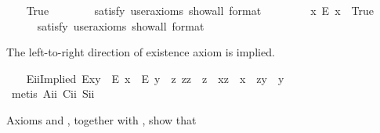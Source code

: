 \begin{isabellebody}
\begin{isamarkuptext}
\end{isamarkuptext}\isamarkuptrue%
\ \ \isamarkupfalse%
\ True\ \ %
\isanewline
\ \ \ \ \isamarkupfalse%
\ {\isacharbrackleft}satisfy{\isacharcomma}\ user{\isacharunderscore}axioms{\isacharcomma}\ show{\isacharunderscore}all{\isacharcomma}\ format\ {\isacharequal}\ {}{\isacharbrackright}%
\isadelimproof
\ %
\endisadelimproof
%
\isatagproof
{}\isamarkupfalse%
%
\endisatagproof
{\isafoldproof}%
%
\isadelimproof
%
\endisadelimproof
\isanewline
\ \ \isamarkupfalse%
\ \ {\isachardoublequoteopen}{\isasymexists}x{\isachardot}\ \isactrlbold {\isasymnot}{\isacharparenleft}E\ x{\isacharparenright}{\isachardoublequoteclose}\ \ True\ \ %
\ \ \isanewline
\ \ \ \ \isamarkupfalse%
\ {\isacharbrackleft}satisfy{\isacharcomma}\ user{\isacharunderscore}axioms{\isacharcomma}\ show{\isacharunderscore}all{\isacharcomma}\ format\ {\isacharequal}\ {}{\isacharbrackright}%
\isadelimproof
\ %
\endisadelimproof
%
\isatagproof
{}\isamarkupfalse%
%
\endisatagproof
{\isafoldproof}%
%
\isadelimproof
%
\endisadelimproof
%
\begin{isamarkuptext}%
The left-to-right direction of existence axiom  is implied.%
\end{isamarkuptext}\isamarkuptrue%
\ \ \isamarkupfalse%
\ E\isactrlsub i\isactrlsub iImplied{\isacharcolon}\ {\isachardoublequoteopen}E{\isacharparenleft}x{\isasymcdot}y{\isacharparenright}\ \isactrlbold {\isasymrightarrow}\ {\isacharparenleft}E\ x\ \isactrlbold {\isasymand}\ E\ y\ \isactrlbold {\isasymand}\ {\isacharparenleft}\isactrlbold {\isasymexists}z{\isachardot}\ z{\isasymcdot}z\ {\isasymcong}\ z\ \isactrlbold {\isasymand}\ x{\isasymcdot}z\ {\isasymcong}\ x\ \isactrlbold {\isasymand}\ z{\isasymcdot}y\ {\isasymcong}\ y{\isacharparenright}{\isacharparenright}{\isachardoublequoteclose}\ \isanewline
%
\isadelimproof
\ \ \ \ %
\endisadelimproof
%
\isatagproof
{}\isamarkupfalse%
\ {\isacharparenleft}metis\ A\isactrlsub i\isactrlsub i\ C\isactrlsub i\isactrlsub i\ S\isactrlsub i\isactrlsub i{\isacharparenright}%
\endisatagproof
{\isafoldproof}%
%
\isadelimproof
%
\endisadelimproof
%
\begin{isamarkuptext}%
Axioms  and , together with , show that

\end{isamarkuptext}
\end{isabellebody}

